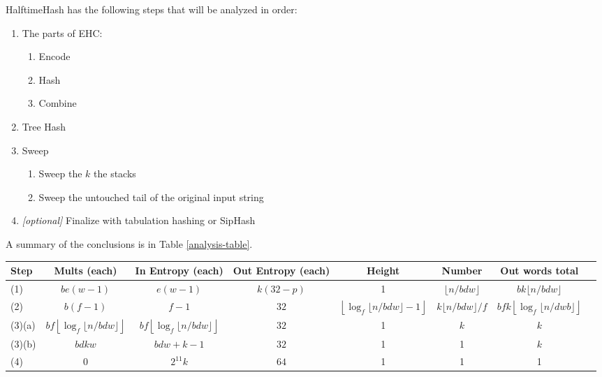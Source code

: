 \documentclass[sigconf, nonacm]{acmart}
\begin{document}
HalftimeHash has the following steps that will be analyzed in order:

\begin{enumerate}
\item The parts of EHC:
  \begin {enumerate}
  \item Encode
  \item Hash
  \item Combine
  \end{enumerate}
\item Tree Hash
\item Sweep
  \begin{enumerate}
  \item Sweep the $k$ the stacks
  \item Sweep the untouched tail of the original input string
  \end{enumerate}
\item{} {\em [optional]} Finalize with tabulation hashing or SipHash
\end{enumerate}

A summary of the conclusions is in Table \ref{analysis-table}.

\begin{table*}
\begin{tabular}{|l|c|c|c|c|c|c|c|}
  \hline {\bf Step} & {\bf Mults (each)} & {\bf In Entropy (each)} & {\bf Out Entropy (each)} & {\bf Height} & {\bf Number} & {\bf Out words total}\\
  \hline (1) & $b e(w-1)$ & $e(w-1)$ & $k(32-p)$ & 1 & $\lfloor n/b d w \rfloor$ & $b k \lfloor n/b d w \rfloor$ \\
  \hline (2) & $b (f-1)$ & $f-1$ & $32$ & $\left\lfloor\log_f\lfloor n/b d w \rfloor - 1\right\rfloor$ & $k \lfloor n / b d w \rfloor / f$ & $b f k \left\lfloor\log_f\lfloor n/d w b \rfloor\right\rfloor$ \\
  \hline (3)(a) & $b f \left\lfloor\log_f\lfloor n/b d w \rfloor\right\rfloor$ & $b f \left\lfloor\log_f\lfloor n/b d w \rfloor\right\rfloor$ & $32$ & 1 & $k$ & $k$ \\
  \hline (3)(b) & $b d k w$ &  $b d w + k - 1$ & $32$ & 1 & 1 & $k$ \\
  \hline (4) & 0 &  $2^{11}k$ & $64$ & 1 & 1 & 1 \\
  \hline
\end{tabular}
\caption{\label{analysis-table}
  Statistics for number of multiplications, amount of input entropy (in 64-bit words), and output entropy (counted in bits) of each step in HalftimeHash.
  Additionally, each step has a height and width listed.
  Height is the longest dependency chain between executions of the primitive in the listed step.
  Number is the total number of executions of that primitive in an execution of HalftimeHash.
  The multiplications in total for a step is the product of the multiplications in each times the number of executions of that primitive.
  The collision probability is the product of the height and the collision probability of each execution of the primitive.
}
\end{table*}
\end{document}

